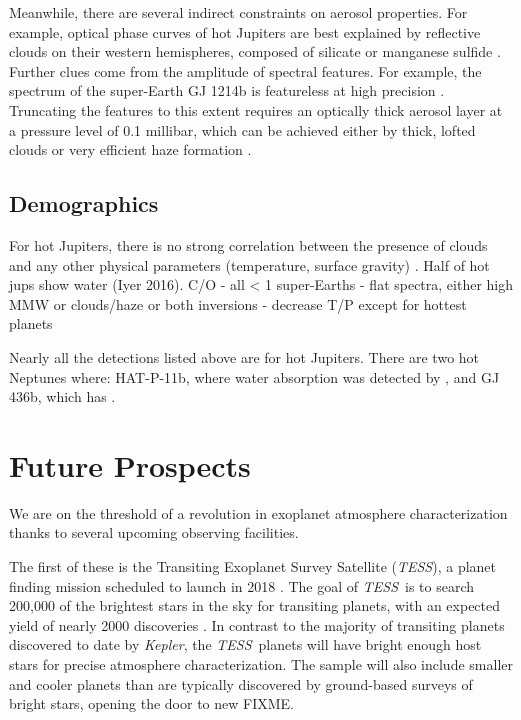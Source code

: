 \documentclass[graybox,natbib,nosecnum]{svmult}
\newcommand{\project}[1]{\textsl{#1}}
\newcommand{\TESS}{\project{TESS}}
\newcommand{\Kepler}{\project{Kepler}}
\begin{document}
Meanwhile, there are several indirect constraints on aerosol properties.  For example, optical phase curves of hot Jupiters are best explained by reflective clouds on their western hemispheres, composed of silicate or manganese sulfide \citep{demory13, oreshenko16, parmentier16}. Further clues come from the amplitude of spectral features. For example, the spectrum of the super-Earth GJ 1214b is featureless at high precision \citep[30 ppm,][]{kreidberg14a}.  Truncating the features to this extent requires an optically thick aerosol layer at a pressure level of 0.1 millibar, which can be achieved either by thick, lofted clouds or very efficient haze formation \citep{morley15}.  

\subsection{Demographics}
For hot Jupiters, there is no strong correlation between the presence of clouds and any other physical parameters (temperature, surface gravity) \citep{sing16}. Half of hot jups show water (Iyer 2016).
C/O - all < 1
super-Earths - flat spectra, either high MMW or clouds/haze or both
inversions - decrease T/P except for hottest planets 

Nearly all the detections listed above are for hot Jupiters. There are two hot Neptunes where: HAT-P-11b, where water absorption was detected by \cite{fraine15}, and GJ 436b, which has \citep{stevenson10, morley17, FIXME}. 

\section{Future Prospects}
We are on the threshold of a revolution in exoplanet atmosphere characterization thanks to several upcoming observing facilities. 

The first of these is the Transiting Exoplanet Survey Satellite (\TESS), a planet finding mission scheduled to launch in 2018 \citep{ricker14}.  The goal of \TESS\ is to search 200,000 of the brightest stars in the sky for transiting planets, with an expected yield of nearly 2000 discoveries \citep{sullivan15}. In contrast to the majority of transiting planets discovered to date by \Kepler, the \TESS\ planets will have bright enough host stars for precise atmosphere characterization. The sample will also include smaller and cooler planets than are typically discovered by ground-based surveys of bright stars, opening the door to new FIXME.
\end{document}
